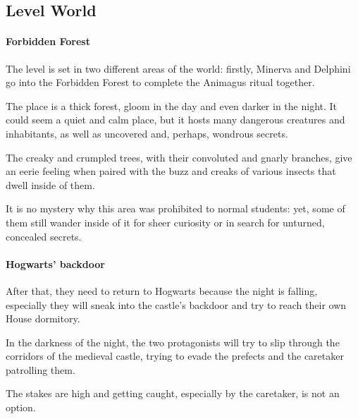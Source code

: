 \pagebreak

\subsection{Level World}

\paragraph{Forbidden Forest}
The level is set in two different areas of the world: firstly, Minerva and Delphini go into the Forbidden Forest to complete the Animagus ritual together. 

The place is a thick forest, gloom in the day and even darker in the night. It could seem a quiet and calm place, but it hosts many dangerous creatures and inhabitants, as well as uncovered and, perhaps, wondrous secrets.


The creaky and crumpled trees, with their convoluted and gnarly branches, give an eerie feeling when paired with the buzz and creaks of various insects that dwell inside of them.

It is no mystery why this area was prohibited to normal students: yet, some of them still wander inside of it for sheer curiosity or in search for unturned, concealed secrets.

\paragraph{Hogwarts' backdoor}

After that, they need to return to Hogwarts because the night is falling, especially they will sneak into the castle's backdoor and try to reach their own House dormitory.


In the darkness of the night, the two protagonists will try to slip through the corridors of the medieval castle, trying to evade the prefects and the caretaker patrolling them.


The stakes are high and getting caught, especially by the caretaker, is not an option. 


\pagebreak